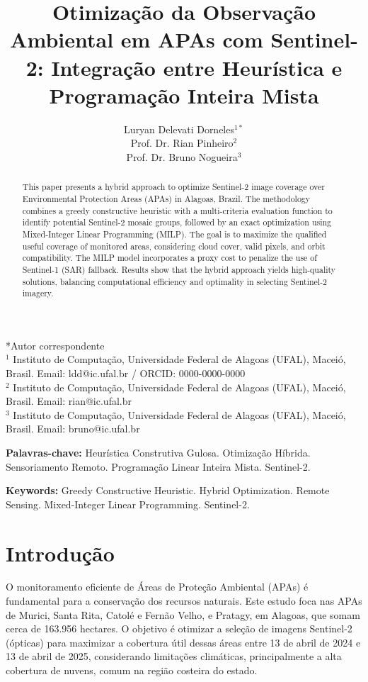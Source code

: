 \documentclass[a4paper,11pt]{article}
\title{Otimização da Observação Ambiental em APAs com Sentinel-2: Integração entre Heurística e Programação Inteira Mista}
\author{
Luryan Delevati Dorneles$^{1*}$ \\
Prof. Dr. Rian Pinheiro$^{2}$ \\
Prof. Dr. Bruno Nogueira$^{3}$
}
\date{}
\begin{document}
\maketitle

\vspace{-0.5cm}

\begin{center}
{\footnotesize
*Autor correspondente\\
$^1$ Instituto de Computação, Universidade Federal de Alagoas (UFAL), Maceió, Brasil. Email: ldd@ic.ufal.br / ORCID: 0000-0000-0000\\
$^2$ Instituto de Computação, Universidade Federal de Alagoas (UFAL), Maceió, Brasil. Email: rian@ic.ufal.br\\
$^3$ Instituto de Computação, Universidade Federal de Alagoas (UFAL), Maceió, Brasil. Email: bruno@ic.ufal.br
}
\end{center}

\bigskip
\noindent
{\small{\bf Palavras-chave:} Heurística Construtiva Gulosa. Otimização Híbrida. Sensoriamento Remoto. Programação Linear Inteira Mista. Sentinel-2.}

\vspace{8mm}

\begin{abstract}
This paper presents a hybrid approach to optimize Sentinel-2 image coverage over Environmental Protection Areas (APAs) in Alagoas, Brazil. The methodology combines a greedy constructive heuristic with a multi-criteria evaluation function to identify potential Sentinel-2 mosaic groups, followed by an exact optimization using Mixed-Integer Linear Programming (MILP). The goal is to maximize the qualified useful coverage of monitored areas, considering cloud cover, valid pixels, and orbit compatibility. The MILP model incorporates a proxy cost to penalize the use of Sentinel-1 (SAR) fallback. Results show that the hybrid approach yields high-quality solutions, balancing computational efficiency and optimality in selecting Sentinel-2 imagery.
\end{abstract}

\bigskip
\noindent
{\small{\bf Keywords:} Greedy Constructive Heuristic. Hybrid Optimization. Remote Sensing. Mixed-Integer Linear Programming. Sentinel-2.}

\newpage

\section{Introdução}
O monitoramento eficiente de Áreas de Proteção Ambiental (APAs) é fundamental para a conservação dos recursos naturais. Este estudo foca nas APAs de Murici, Santa Rita, Catolé e Fernão Velho, e Pratagy, em Alagoas, que somam cerca de 163.956 hectares. O objetivo é otimizar a seleção de imagens Sentinel-2 (ópticas) para maximizar a cobertura útil dessas áreas entre 13 de abril de 2024 e 13 de abril de 2025, considerando limitações climáticas, principalmente a alta cobertura de nuvens, comum na região costeira do estado.
\end{document}
